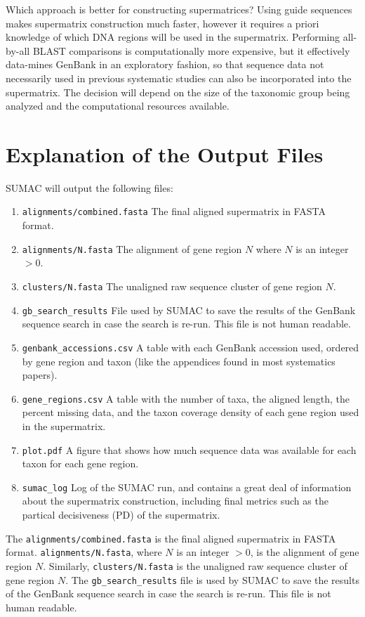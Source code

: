 \documentclass[10pt]{report}
\begin{document}
Which approach is better for constructing supermatrices?
Using guide sequences makes supermatrix construction much faster, however
it requires a priori knowledge of which DNA regions will be used
in the supermatrix.
Performing all-by-all BLAST comparisons is computationally
more expensive, but it effectively data-mines GenBank in an exploratory
fashion, so that sequence data not necessarily used in previous systematic
studies can also be incorporated into the supermatrix.
The decision will depend on the size of the taxonomic group being
analyzed and the computational resources available.

\section{Explanation of the Output Files}

SUMAC will output the following files:

\begin{enumerate}
\item \texttt{alignments/combined.fasta} The final aligned supermatrix in FASTA format.
\item \texttt{alignments/N.fasta} The alignment of gene region $N$ where $N$ is an integer $> 0$.
\item \texttt{clusters/N.fasta} The unaligned raw sequence cluster of gene region $N$.
\item \texttt{gb\_search\_results} File used by SUMAC to save the results of the GenBank sequence search in case the search is re-run. This file is not human readable.
\item \texttt{genbank\_accessions.csv} A table with each GenBank accession used, ordered by gene region and taxon (like the appendices found in most systematics papers).
\item \texttt{gene\_regions.csv} A table with the number of taxa, the aligned length, the percent missing data, and the taxon coverage density of each gene region used in the supermatrix.
\item \texttt{plot.pdf} A figure that shows how much sequence data was available for each taxon for each gene region.
\item \texttt{sumac\_log} Log of the SUMAC run, and contains a great deal of information about the supermatrix construction, including final metrics such as the partical decisiveness (PD) of the supermatrix.
\end{enumerate}

\iffalse
The \verb|alignments/combined.fasta| is the final aligned supermatrix in FASTA format.
\verb|alignments/N.fasta|, where $N$ is an integer $> 0$, is the alignment of gene region $N$.
Similarly, \verb|clusters/N.fasta| is the unaligned raw sequence cluster of gene region $N$.
The \verb|gb_search_results| file is used by SUMAC to save the results of the GenBank
sequence search in case the search is re-run. This file is not human readable.
\end{document}
